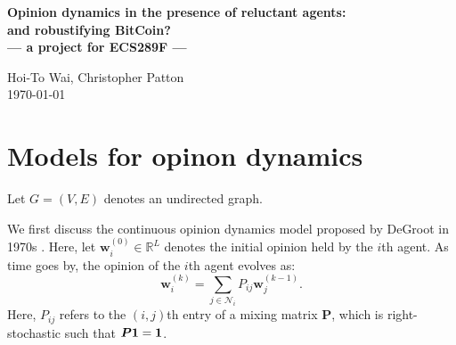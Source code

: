 \documentclass[10pt]{article}
\theoremstyle{t}
\begin{document}
\setcounter{page}{1}
\linespread{1.1}
\normalsize

\begin{center} \Large {\bf
Opinion dynamics in the presence of reluctant agents: \\ and robustifying BitCoin? \\ --- a project for ECS289F ---} \vspace{.5cm}

{\large Hoi-To Wai, Christopher Patton \\

\today}

\end{center}
\vspace{0.3cm}


 \begin{abstract}
This note is a summary of the rudimentary ideas I have for ECS289F's project. Specifically, I will propose a model for the opinion dynamics with reluctant agents, i.e., agents who are reluctant to blend their idea with his/her neighbors. Explorations into the Bitcoin attack model will also be investigated. (For the references cited here, I believe that better references must exists, but I will need to spend more time on mining them.)
\end{abstract}



\section{Models for opinon dynamics}
Let $G = (V,E)$ denotes an undirected graph. \vspace{.2cm}


We first discuss the continuous opinion dynamics model proposed by DeGroot in 1970s \cite{Degroot_74}. Here, let ${\bm w}_i^{(0)} \in \mathbb{R}^L$ denotes the initial opinion held by the $i$th agent. As time goes by, the opinion of the $i$th agent evolves as:
\begin{equation}\label{eq:op}
{\bm w}_i^{(k)} = \sum_{j \in \mathcal{N}_i} P_{ij} {\bm w}_j^{(k-1)}. 
\end{equation}
Here, $P_{ij}$ refers to the $(i,j)$th entry of a mixing matrix ${\bm P}$, which is right-stochastic such that ${\bm P} {\bf 1} = {\bf 1}$. \vspace{.2cm}
\end{document}
